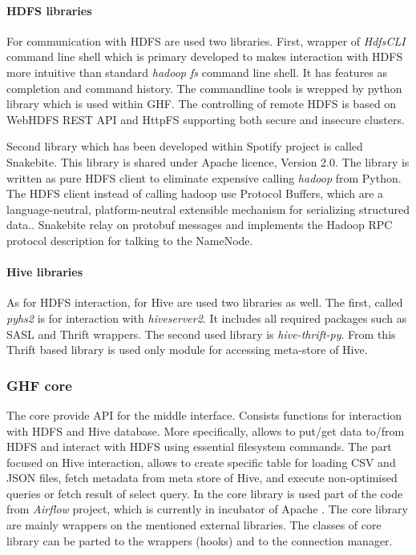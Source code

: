 \documentclass[a4paper,12pt,oneside]{report}
\begin{document}
	\paragraph{HDFS libraries}
	For communication with HDFS are used two libraries. First, wrapper of
	\textit{HdfsCLI} command line shell which is primary developed to makes
	interaction with HDFS more intuitive than standard \textit{hadoop fs} command
	line shell. It has features as completion and command history.
	The commandline  tools is wrepped by python library which is used within GHF. The controlling of
	remote HDFS is based on WebHDFS REST API and HttpFS supporting both secure and
	insecure clusters.
	
	Second library which has been developed within Spotify project is called
	Snakebite. This library is shared under Apache licence, Version
	2.0. The library is written as pure HDFS client to eliminate expensive calling
	\textit{hadoop} from Python. The HDFS client instead of calling hadoop use
	Protocol Buffers, which  are a language-neutral, platform-neutral extensible
	mechanism for serializing structured data.\cite{protobuf}. Snakebite relay on
	protobuf messages and implements the Hadoop RPC protocol description for talking
	to the NameNode.\cite{snakebite}
	
	\paragraph{Hive libraries}
	As for HDFS interaction, for Hive are used two libraries as well. The first,
	called \textit{pyhs2} is for interaction with \textit{hiveserver2}. It includes all
	required packages such as SASL and Thrift wrappers. The second used library is
	\textit{hive-thrift-py}. From this Thrift based library is used only module for
	accessing meta-store of Hive.
	
	\subsubsection{GHF core}
	The core provide API for the middle interface. Consists functions for
	interaction with HDFS and Hive database. More specifically, allows to put/get
	data to/from HDFS and interact with HDFS using essential filesystem commands.
	The part focused on Hive interaction, allows to create specific table for
	loading CSV and JSON files, fetch metadata from meta store of Hive, and execute
	non-optimised queries or fetch result of select query. In the core library is
	used part of the code from \textit{Airflow} project, which is currently in
	incubator of Apache \cite{airflow_diff}. The core library are mainly wrappers on
	the mentioned external libraries. The classes of core library can be parted to
	the  wrappers (hooks) and to the connection manager. 
	
\end{document}
